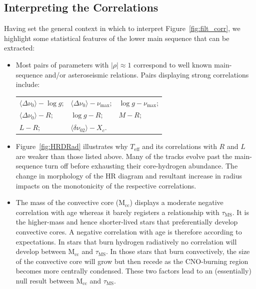 \subsection{Interpreting the Correlations}
Having set the general context in which to interpret Figure~\ref{fig:filt_corr}, we highlight some statistical features of the lower main sequence that can be extracted: 

\begin{itemize}
\item Most pairs of parameters with ${| \rho | \approx 1}$ correspond to well known main-sequence and/or asteroseismic relations. Pairs displaying strong correlations include:

\begin{tabular}{lll}
  $\langle\Delta\nu_0\rangle  -  \log{} g$; 
& $\langle\Delta\nu_0\rangle - \nu_{\max}$; 
& $\log{} g - \nu_{\max}$;  \\
  $\langle\Delta\nu_0\rangle - R$; 
& $\log{} g - R$; 
& $M  -  R$;  \\
  $L - R$; 
& $\langle\delta\nu_{02}\rangle - X_c$. 
&
\end{tabular}

\item Figure~\ref{fig:HRDRad} illustrates why $T_{\text{eff}}$ and its correlations with $R$ and $L$ are weaker than those listed above. 
Many of the tracks evolve past the main-sequence turn off before exhausting their core-hydrogen abundance. The change in morphology of the HR diagram and resultant increase in radius impacts on the monotonicity of the respective correlations. 

 

\item The mass of the convective core (M$_{\text{cc}}$) displays a moderate negative correlation with age whereas it barely registers a relationship with $\tau_{\text{MS}}$. 
It is the higher-mass and hence shorter-lived stars that preferentially develop convective cores. A negative correlation with age is therefore according to expectations.  
In stars that burn hydrogen radiatively no correlation will develop between M$_{\text{cc}}$ and $\tau_{\text{MS}}$. 
In those stars that burn convectively, the size of the convective core will grow but then recede as the CNO-burning region becomes more centrally condensed. 
These two factors lead to an (essentially) null result between M$_{\text{cc}}$ and $\tau_{\text{MS}}$. 



\end{itemize}
